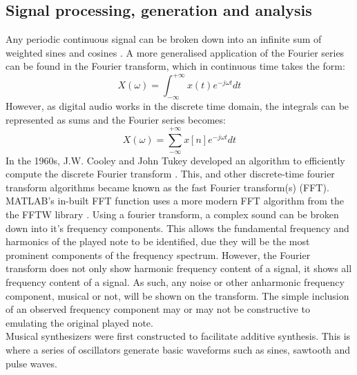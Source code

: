 \documentclass{article}
\begin{document}
    \subsection{Signal processing, generation and analysis}
        Any periodic continuous signal can be broken down into an infinite sum of weighted sines and cosines \cite{weisstein2004fourier}.
        A more generalised application of the Fourier series can be found in the Fourier transform, which in continuous time takes the form:
        \begin{equation}
            X(\omega) = \int_{-\infty}^{+\infty}x(t)e^{-j\omega t}dt
        \end{equation}
        However, as digital audio works in the discrete time domain, the integrals can be represented as sums and the Fourier series becomes:
        \begin{equation}
            X(\omega) = \sum_{-\infty}^{+\infty}x[n]e^{-j\omega t}dt
        \end{equation}
        In the 1960s, J.W. Cooley and John Tukey developed an algorithm to efficiently compute the discrete Fourier transform \cite{cooley1965algorithm}.
        This, and other discrete-time fourier transform algorithms became known as the fast Fourier transform(s) (FFT).
        MATLAB's in-built FFT function uses a more modern FFT algorithm from the the FFTW library \cite{frigo1998fftw}.
        Using a fourier transform, a complex sound can be broken down into it's frequency components.
        This allows the fundamental frequency and harmonics of the played note to be identified, due they will be the most prominent components of the frequency spectrum.
        However, the Fourier transform does not only show harmonic frequency content of a signal, it shows all frequency content of a signal.
        As such, any noise or other anharmonic frequency component, musical or not, will be shown on the transform.
        The simple inclusion of an observed frequency component may or may not be constructive to emulating the original played note.
        \\
        Musical synthesizers were first constructed to facilitate additive synthesis.
        This is where a series of oscillators generate basic waveforms such as sines, sawtooth and pulse waves.
\end{document}
